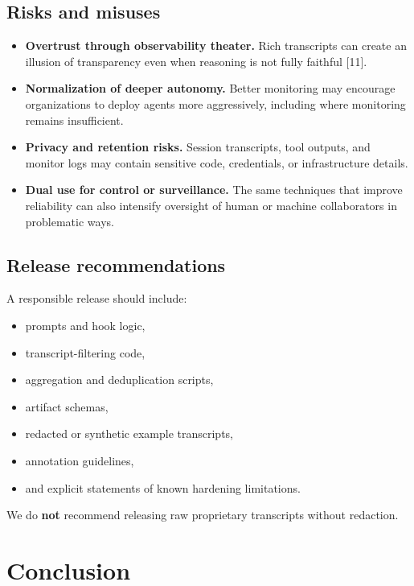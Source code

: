 \documentclass[11pt]{article}
\begin{document}
\subsection{Risks and misuses}

\begin{itemize}[leftmargin=*,itemsep=2pt]
  \item \textbf{Overtrust through observability theater.} Rich transcripts can create an illusion of transparency even when reasoning is not fully faithful [11].
  \item \textbf{Normalization of deeper autonomy.} Better monitoring may encourage organizations to deploy agents more aggressively, including where monitoring remains insufficient.
  \item \textbf{Privacy and retention risks.} Session transcripts, tool outputs, and monitor logs may contain sensitive code, credentials, or infrastructure details.
  \item \textbf{Dual use for control or surveillance.} The same techniques that improve reliability can also intensify oversight of human or machine collaborators in problematic ways.
\end{itemize}

\subsection{Release recommendations}

A responsible release should include:
\begin{itemize}[leftmargin=*,itemsep=2pt]
  \item prompts and hook logic,
  \item transcript-filtering code,
  \item aggregation and deduplication scripts,
  \item artifact schemas,
  \item redacted or synthetic example transcripts,
  \item annotation guidelines,
  \item and explicit statements of known hardening limitations.
\end{itemize}

We do \textbf{not} recommend releasing raw proprietary transcripts without redaction.

\section{Conclusion}
\end{document}
